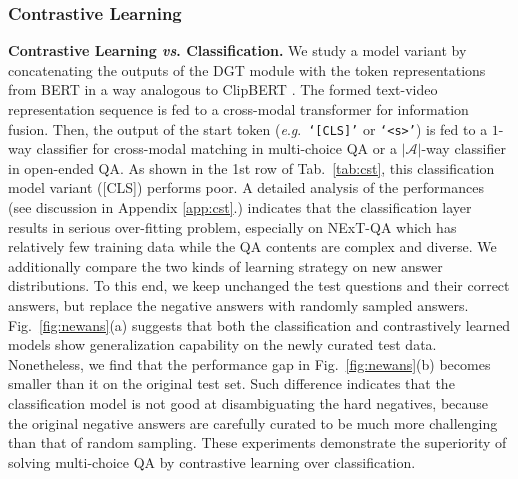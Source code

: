 \documentclass[10pt,journal,compsoc]{IEEEtran}
\newcommand{\vs}{\textit{vs}. }
\newcommand{\eg}{\textit{e}.\textit{g}.}
\begin{document}
\subsubsection{Contrastive Learning}
\label{sec:cst}
\textbf{Contrastive Learning \vs Classification.}
We study a model variant by concatenating the outputs of the DGT module with the token representations from BERT in a way analogous to ClipBERT \cite{lei2021less}. The formed text-video representation sequence is fed to a cross-modal transformer for information fusion. Then, the output of the start token (\eg~\texttt{`[CLS]'} or \texttt{`<s>'}) is fed to a $1$-way classifier for cross-modal matching in multi-choice QA or a $|\mathcal{A}|$-way classifier in open-ended QA. As shown in the 1st row of Tab.~\ref{tab:cst}, this classification model variant ([CLS]) performs poor. A detailed analysis of the performances (see discussion in Appendix \ref{app:cst}.) indicates that the classification layer results in serious over-fitting problem, especially on NExT-QA which has relatively few training data while the QA contents are complex and diverse. We additionally compare the two kinds of learning strategy on new answer distributions. To this end, we keep unchanged the test questions and their correct answers, but replace the negative answers with randomly sampled answers. Fig.~\ref{fig:newans}(a) suggests that both the classification and contrastively learned models show generalization capability on the newly curated test data. Nonetheless, we find that the performance gap in Fig.~\ref{fig:newans}(b) becomes smaller than it on the original test set. Such difference indicates that the classification model is not good at disambiguating the hard negatives, because the original negative answers are carefully curated to be much more challenging than that of random sampling. These experiments demonstrate the superiority of solving multi-choice QA by contrastive learning over classification. 
\setlength{\tabcolsep}{2pt}
\begin{table}[t!]
    \small
    \centering
    \caption{Study of contrastive learning. RBT: RoBERTa.}
    \label{tab:cst}
    \vspace{-0.5em}
    \vspace{-0.5cm}
\end{table}
\end{document}
